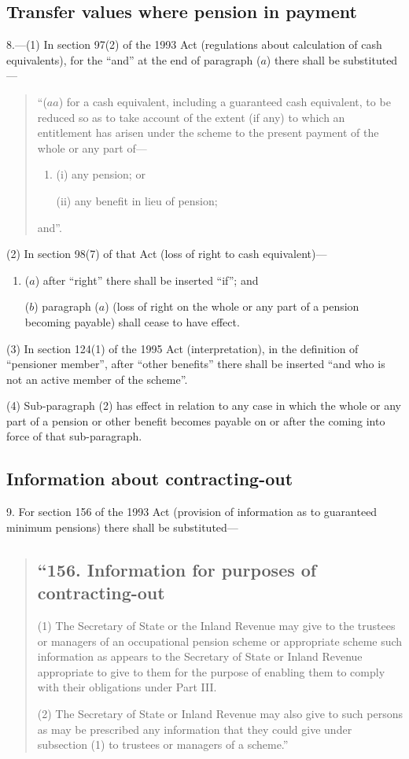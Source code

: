 \documentclass[12pt,a4paper]{article}
\begin{document}
\subsection*{Transfer values where pension in payment}

8.---(1) In section 97(2)  of the 1993 Act (regulations about calculation of cash equivalents), for the “and” at the end of paragraph ($a$)  there shall be substituted—
\begin{quotation}
“($aa$) for a cash equivalent, including a guaranteed cash equivalent, to be reduced so as to take account of the extent (if any) to which an entitlement has arisen under the scheme to the present payment of the whole or any part of—
\begin{enumerate}\item[]
(i) any pension; or

(ii) any benefit in lieu of pension;
\end{enumerate}
and”.
\end{quotation}

(2) In section 98(7)  of that Act (loss of right to cash equivalent)—
\begin{enumerate}\item[]
($a$) after “right” there shall be inserted “if”; and

($b$) paragraph ($a$)  (loss of right on the whole or any part of a pension becoming payable) shall cease to have effect.
\end{enumerate}

(3) In section 124(1)  of the 1995 Act (interpretation), in the definition of “pensioner member”, after “other benefits” there shall be inserted “and who is not an active member of the scheme”.

(4) Sub-paragraph (2)  has effect in relation to any case in which the whole or any part of a pension or other benefit becomes payable on or after the coming into force of that sub-paragraph.

\subsection*{Information about contracting-out}

9. For section 156 of the 1993 Act (provision of information as to guaranteed minimum pensions) there shall be substituted—
\begin{quotation}
\subsection*{“156. Information for purposes of contracting-out}

(1) The Secretary of State or the Inland Revenue may give to the trustees or managers of an occupational pension scheme or appropriate scheme such information as appears to the Secretary of State or Inland Revenue appropriate to give to them for the purpose of enabling them to comply with their obligations under Part III.

(2) The Secretary of State or Inland Revenue may also give to such persons as may be prescribed any information that they could give under subsection (1)  to trustees or managers of a scheme.”
\end{quotation}
\end{document}

